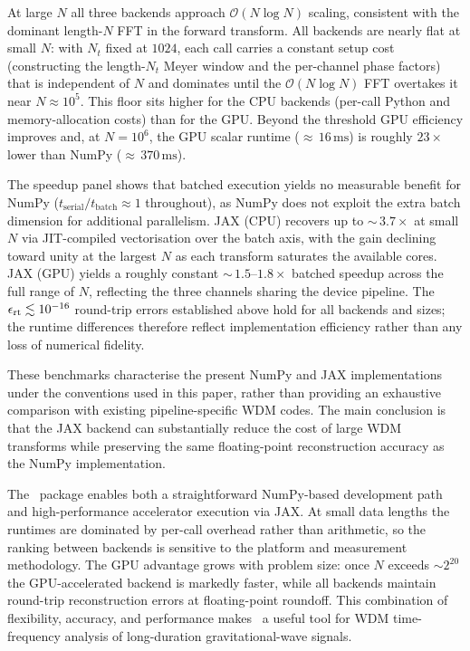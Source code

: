 \documentclass[twocolumn,preprintnumbers,
  superscriptaddress,
  nofootinbib,
  amsmath,
  amssymb,
  aps,
  prd,
  colorlinks=true,
  linkcolor=blue,
  urlcolor=blue,
  citecolor=blue,
  anchorcolor=blue
]{revtex4-2}
\begin{document}
At large $N$ all three backends approach $\mathcal{O}(N\log N)$ scaling, consistent with the dominant length-$N$ FFT in the forward transform.  All backends are nearly flat at small $N$: with $N_t$ fixed at $1024$, each call carries a constant setup cost (constructing the length-$N_t$ Meyer window and the per-channel phase factors) that is independent of $N$ and dominates until the $\mathcal{O}(N\log N)$ FFT overtakes it near $N\approx10^5$. This floor sits higher for the CPU backends (per-call Python and memory-allocation costs) than for the GPU. Beyond the threshold GPU efficiency improves and, at $N = 10^6$, the GPU scalar runtime (${\approx}\,16\,\mathrm{ms}$) is roughly $23\times$ lower than NumPy (${\approx}\,370\,\mathrm{ms}$).

The speedup panel shows that batched execution yields no measurable benefit for NumPy ($t_\mathrm{serial}/t_\mathrm{batch} \approx 1$ throughout), as NumPy does not exploit the extra batch dimension for additional parallelism.  JAX (CPU) recovers up to ${\sim}\,3.7\times$ at small $N$ via JIT-compiled vectorisation over the batch axis, with the gain declining toward unity at the largest $N$ as each transform saturates the available cores.
JAX (GPU) yields a roughly constant ${\sim}\,1.5$--$1.8\times$ batched speedup across the full range of $N$, reflecting the three channels sharing the device pipeline.  The $\epsilon_{\rm rt} \lesssim 10^{-16}$ round-trip errors established above hold for all backends and sizes; the runtime differences therefore reflect implementation efficiency rather than any loss of numerical fidelity.

These benchmarks characterise the present NumPy and JAX implementations under the conventions used in this paper, rather than providing an exhaustive comparison with existing pipeline-specific WDM codes. The main conclusion is that the JAX backend can substantially reduce the cost of large WDM transforms while preserving the same floating-point reconstruction accuracy as the NumPy implementation.

The \package\ package enables both a straightforward NumPy-based development path and high-performance accelerator execution via JAX. At small data lengths the runtimes are dominated by per-call overhead rather than arithmetic, so the ranking between backends is sensitive to the platform and measurement methodology. The GPU advantage grows with problem size: once $N$ exceeds $\sim 2^{20}$ the GPU-accelerated backend is markedly faster, while all backends maintain round-trip reconstruction errors at floating-point roundoff.
This combination of flexibility, accuracy, and performance makes \package\ a useful tool for WDM time-frequency analysis of long-duration gravitational-wave signals.
\end{document}
